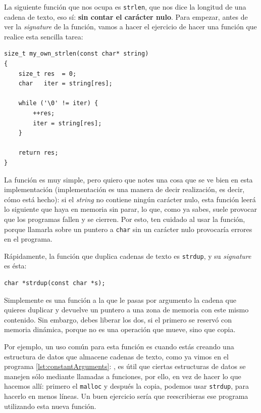 \documentclass[a4paper]{article}
\begin{document}
La siguiente función que nos ocupa es \verb!strlen!, que nos dice la longitud
de una cadena de texto, eso sí: \textbf{sin contar el carácter nulo}. Para
empezar, antes de ver la \emph{signature} de la función, vamos a hacer el
ejercicio de hacer una función que realice esta sencilla tarea:

\noindent
\begin{minipage}[H]{\linewidth}
\mbox{}
\begin{lstlisting}[style=C,
caption={Propia versión de \texttt{strlen}},
label={lst:ownStrlen}]
size_t my_own_strlen(const char* string)
{
    size_t res  = 0;
    char   iter = string[res];

    while ('\0' != iter) {
        ++res;
        iter = string[res];
    }

    return res;
}
\end{lstlisting}
\end{minipage}

La función es muy simple, pero quiero que notes una cosa que se ve bien en
esta implementación (implementación es una manera de decir realización, es
decir, cómo está hecho):
si el \emph{string} no contiene ningún carácter nulo,
esta función leerá lo siguiente que haya en memoria sin parar, lo que, como
ya sabes, suele provocar que los programas fallen y se cierren. Por esto,
ten cuidado al usar la función, porque llamarla sobre un puntero a \verb!char!
sin un carácter nulo provocaría errores en el programa.

Rápidamente, la función que duplica cadenas de texto es \verb!strdup!, y su
\emph{signature} es ésta:

\noindent
\begin{minipage}[H]{\linewidth}
\mbox{}
\begin{lstlisting}[style=C,
caption={Definición de \texttt{strdup}},
label={lst:ownStrlen}]
char *strdup(const char *s);
\end{lstlisting}
\end{minipage}
Simplemente es una función a la que le pasas por argumento la cadena que quieres
duplicar y devuelve un puntero a una zona de memoria con este mismo contenido.
Sin embargo, debes liberar los dos, si el primero se reservó con memoria
dinámica, porque no es una operación que mueve, sino que copia.

Por ejemplo, un uso común para esta función es cuando estás creando una
estructura de datos que almacene cadenas de texto, como ya vimos en el programa
\ref{lst:constantArguments}: , es útil que
ciertas estructuras de datos se manejen sólo mediante llamadas a funciones,
por ello, en vez de hacer lo que hacemos allí: primero el \verb!malloc! y
después la copia, podemos usar \verb!strdup!, para hacerlo en menos líneas.
Un buen ejercicio sería que reescribieras ese programa utilizando esta nueva
función.
\end{document}
